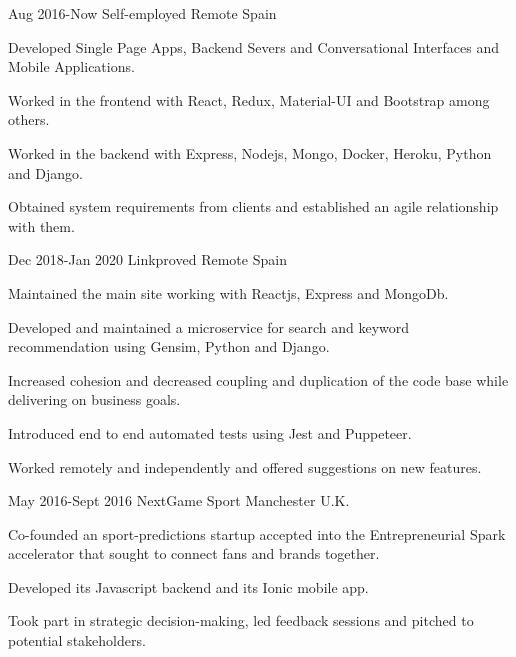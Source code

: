 \documentclass[10pt]{CurriculumVitae}
\begin{document}
      {Aug 2016-Now}
      {Self-employed}
      {Remote}
      {Spain}
      {
        \item Developed Single Page Apps, Backend Severs and Conversational Interfaces and Mobile Applications.
        \item Worked in the frontend with React, Redux, Material-UI and Bootstrap among others.
        \item Worked in the backend with Express, Nodejs, Mongo, Docker, Heroku, Python and Django.
        \item Obtained system requirements from clients and established an agile relationship with them.
      }

      {Dec 2018-Jan 2020}
      {Linkproved}
      {Remote}
      {Spain}
      {
        \item Maintained the main site working with Reactjs, Express and MongoDb.
        \item Developed and maintained a microservice for search and keyword recommendation using Gensim, Python and Django.
        \item Increased cohesion and decreased coupling and duplication of the code base while delivering on business goals.
        \item Introduced end to end automated tests using Jest and Puppeteer.
        \item Worked remotely and independently and offered suggestions on new features.
      }
   
      {May 2016-Sept 2016}
      {NextGame Sport} 
      {Manchester}
      {U.K.}
      {
        \item Co-founded an sport-predictions startup accepted into the
          Entrepreneurial Spark accelerator that sought to connect fans and brands together.
        \item Developed its Javascript backend and its Ionic mobile app.
        \item Took part in strategic decision-making, led feedback sessions and pitched to potential stakeholders.
      }
  
\end{document}

